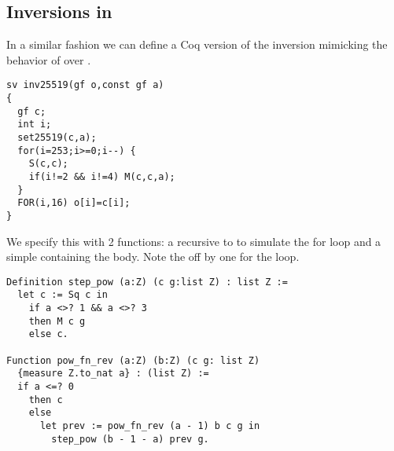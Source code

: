 \subsection{Inversions in \Zfield}

In a similar fashion we can define a Coq version of the inversion mimicking
the behavior of  over .
\begin{lstlisting}[language=Ctweetnacl]
sv inv25519(gf o,const gf a)
{
  gf c;
  int i;
  set25519(c,a);
  for(i=253;i>=0;i--) {
    S(c,c);
    if(i!=2 && i!=4) M(c,c,a);
  }
  FOR(i,16) o[i]=c[i];
}
\end{lstlisting}
We specify this with 2 functions: a recursive  to to simulate the for loop and a simple
 containing the body. Note the off by one for the loop.
\begin{lstlisting}[language=Coq]
Definition step_pow (a:Z) (c g:list Z) : list Z :=
  let c := Sq c in
    if a <>? 1 && a <>? 3
    then M c g
    else c.

Function pow_fn_rev (a:Z) (b:Z) (c g: list Z)
  {measure Z.to_nat a} : (list Z) :=
  if a <=? 0
    then c
    else
      let prev := pow_fn_rev (a - 1) b c g in
        step_pow (b - 1 - a) prev g.
\end{lstlisting}

